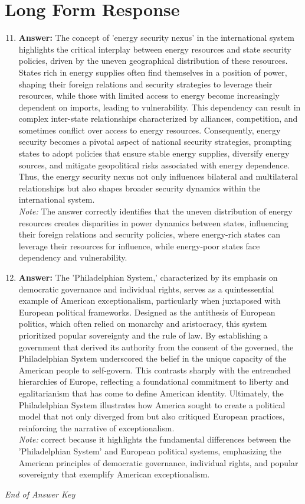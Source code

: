 \documentclass[12pt]{article}
\begin{document}
\section*{Long Form Response}
\begin{enumerate}[label=\arabic*.]
\setcounter{enumi}{10}
\item \textbf{Answer:} The concept of 'energy security nexus' in the international system highlights the critical interplay between energy resources and state security policies, driven by the uneven geographical distribution of these resources. States rich in energy supplies often find themselves in a position of power, shaping their foreign relations and security strategies to leverage their resources, while those with limited access to energy become increasingly dependent on imports, leading to vulnerability. This dependency can result in complex inter-state relationships characterized by alliances, competition, and sometimes conflict over access to energy resources. Consequently, energy security becomes a pivotal aspect of national security strategies, prompting states to adopt policies that ensure stable energy supplies, diversify energy sources, and mitigate geopolitical risks associated with energy dependence. Thus, the energy security nexus not only influences bilateral and multilateral relationships but also shapes broader security dynamics within the international system.
\\ \textit{Note:} The answer correctly identifies that the uneven distribution of energy resources creates disparities in power dynamics between states, influencing their foreign relations and security policies, where energy-rich states can leverage their resources for influence, while energy-poor states face dependency and vulnerability.
\item \textbf{Answer:} The 'Philadelphian System,' characterized by its emphasis on democratic governance and individual rights, serves as a quintessential example of American exceptionalism, particularly when juxtaposed with European political frameworks. Designed as the antithesis of European politics, which often relied on monarchy and aristocracy, this system prioritized popular sovereignty and the rule of law. By establishing a government that derived its authority from the consent of the governed, the Philadelphian System underscored the belief in the unique capacity of the American people to self-govern. This contrasts sharply with the entrenched hierarchies of Europe, reflecting a foundational commitment to liberty and egalitarianism that has come to define American identity. Ultimately, the Philadelphian System illustrates how America sought to create a political model that not only diverged from but also critiqued European practices, reinforcing the narrative of exceptionalism.
\\ \textit{Note:} correct because it highlights the fundamental differences between the 'Philadelphian System' and European political systems, emphasizing the American principles of democratic governance, individual rights, and popular sovereignty that exemplify American exceptionalism.
\end{enumerate}

\vfill
\noindent\textit{End of Answer Key}
\end{document}
